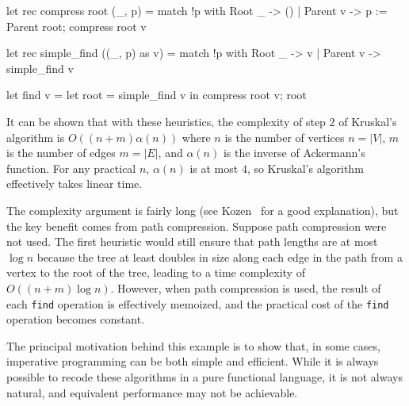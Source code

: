 \begin{ocaml}
let rec compress root (_, p) =
   match !p with
      Root _ -> ()
    | Parent v -> p := Parent root; compress root v

let rec simple_find ((_, p) as v) =
   match !p with
      Root _ -> v
    | Parent v -> simple_find v

let find v =
   let root = simple_find v in
   compress root v;
   root
\end{ocaml}
%
It can be shown that with these heuristics, the complexity of step 2 of Kruskal's algorithm is $O((n
+ m) \alpha(n))$ where $n$ is the number of vertices $n = |V|$, $m$ is the number of edges $m =
|E|$, and $\alpha(n)$ is the inverse of Ackermann's function.  For any practical $n$, $\alpha(n)$ is
at most $4$, so Kruskal's algorithm effectively takes linear time.

The complexity argument is fairly long (see Kozen~\cite{Koz91} for a good explanation), but the key
benefit comes from path compression.  Suppose path compression were not used.  The first heuristic
would still ensure that path lengths are at most $\log n$ because the tree at least doubles in size
along each edge in the path from a vertex to the root of the tree, leading to a time complexity of
$O((n + m) \log n)$.  However, when path compression is used, the result of each \hbox{\lstinline/find/}
operation is effectively memoized, and the practical cost of the \hbox{\lstinline/find/} operation becomes
constant.

The principal motivation behind this example is to show that, in some cases, imperative programming
can be both simple and efficient.  While it is always possible to recode these algorithms in a pure
functional language, it is not always natural, and equivalent performance may not be achievable.

